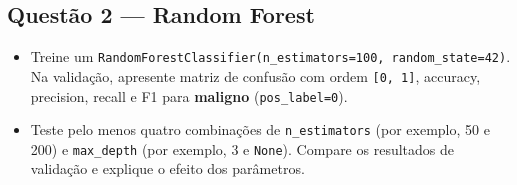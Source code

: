 \documentclass[11pt]{article}
\begin{document}
    \subsection{Questão 2 --- Random
Forest}\label{questuxe3o-2-random-forest}

\begin{itemize}
\item
  Treine um
  \texttt{RandomForestClassifier(n\_estimators=100,\ random\_state=42)}.
  Na validação, apresente matriz de confusão com ordem
  \texttt{{[}0,\ 1{]}}, accuracy, precision, recall e F1 para
  \textbf{maligno} (\texttt{pos\_label=0}).
\item
  Teste pelo menos quatro combinações de \texttt{n\_estimators} (por
  exemplo, 50 e 200) e \texttt{max\_depth} (por exemplo, 3 e
  \texttt{None}). Compare os resultados de validação e explique o efeito
  dos parâmetros.
\end{itemize}
\end{document}
